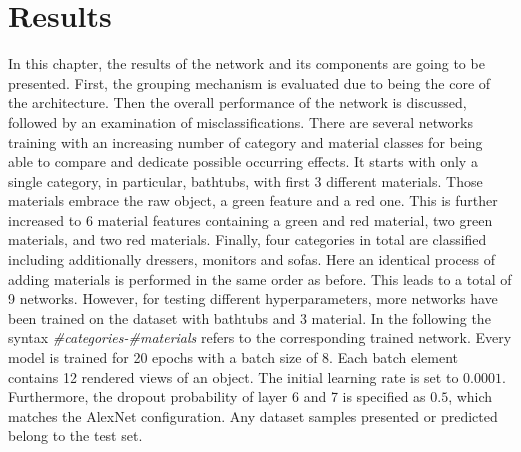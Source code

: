 \chapter{Results}
\label{sec:results}
In this chapter, the results of the network and its components are going to be presented.
First, the grouping mechanism is evaluated due to being the core of the architecture.
Then the overall performance of the network is discussed, followed by an examination of misclassifications.
There are several networks training with an increasing number of category and material classes for being able to compare and dedicate possible occurring effects.
It starts with only a single category, in particular, bathtubs, with first 3 different materials.
Those materials embrace the raw object, a green feature and a red one.
This is further increased to 6 material features containing a green and red material, two green materials, and two red materials.
Finally, four categories in total are classified including additionally dressers, monitors and sofas.
Here an identical process of adding materials is performed in the same order as before.
This leads to a total of 9 networks.
However, for testing different hyperparameters, more networks have been trained on the dataset with bathtubs and 3 material.
In the following the syntax \emph{\#categories-\#materials} refers to the corresponding trained network.
Every model is trained for 20 epochs with a batch size of 8.
Each batch element contains 12 rendered views of an object.
The initial learning rate is set to $0.0001$.
Furthermore, the dropout probability of layer 6 and 7 is specified as $0.5$, which matches the AlexNet configuration.
Any dataset samples presented or predicted belong to the test set.



